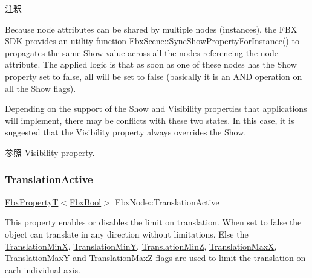 \begin{DoxyRemark}{注釈}
\begin{DoxyItemize}
\item Because node attributes can be shared by multiple nodes (instances), the F\+BX S\+DK provides an utility function \hyperlink{class_fbx_scene_a940444136913f6e50f687ff0807c93e5}{Fbx\+Scene\+::\+Sync\+Show\+Property\+For\+Instance()} to propagates the same Show value across all the nodes referencing the node attribute. The applied logic is that as soon as one of these nodes has the Show property set to {\ttfamily false}, all will be set to {\ttfamily false} (basically it is an A\+ND operation on all the Show flags).\end{DoxyItemize}
\begin{DoxyItemize}
\item Depending on the support of the Show and Visibility properties that applications will implement, there may be conflicts with these two states. In this case, it is suggested that the Visibility property always overrides the Show.\end{DoxyItemize}

\end{DoxyRemark}
\begin{DoxySeeAlso}{参照}
\hyperlink{class_fbx_node_a9f02f0a70b81c1a656137def3e34edb7}{Visibility} property. 
\end{DoxySeeAlso}
\mbox{\label{class_fbx_node_acf5cb5425a24d6e99b19085b93585fcd}} 
\subsubsection{\texorpdfstring{Translation\+Active}{TranslationActive}}
{\footnotesize\ttfamily \hyperlink{class_fbx_property_t}{Fbx\+PropertyT}$<$\hyperlink{fbxtypes_8h_a92e0562b2fe33e76a242f498b362262e}{Fbx\+Bool}$>$ Fbx\+Node\+::\+Translation\+Active}

This property enables or disables the limit on translation. When set to {\ttfamily false} the object can translate in any direction without limitations. Else the \hyperlink{class_fbx_node_a8ffb0049319dbb88db7c0536b4c97339}{Translation\+MinX}, \hyperlink{class_fbx_node_a61c15c2ecc1e454320759c68e95e44b3}{Translation\+MinY}, \hyperlink{class_fbx_node_a0e89c2861ae7bb58014dd0f4ffe069be}{Translation\+MinZ}, \hyperlink{class_fbx_node_a07a5df097d43dc3069669a448b3b8179}{Translation\+MaxX}, \hyperlink{class_fbx_node_a68ce7c657e10023ec08fc70461a3624e}{Translation\+MaxY} and \hyperlink{class_fbx_node_a82452c5c84518939525f69ebbf1cd190}{Translation\+MaxZ} flags are used to limit the translation on each individual axis.

